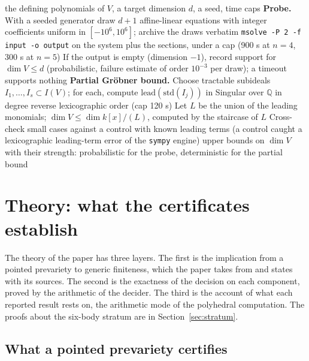 \documentclass[11pt]{article}
\theoremstyle{definition}
\theoremstyle{remark}
\begin{document}
\begin{algorithm}[t]
\caption{Dimension bounds for a variety $V$: random section probe and partial Gr\"obner bound.}\label{alg:probe}
\begin{algorithmic}[1]
\Require the defining polynomials of $V$, a target dimension $d$, a seed, time caps
\State \textbf{Probe.} With a seeded generator draw $d+1$ affine-linear equations with integer coefficients uniform in $[-10^6,10^6]$; archive the draws verbatim
\State \texttt{msolve -P 2 -f input -o output} on the system plus the sections, under a cap (900 s at $n=4$, 300 s at $n=5$)
\State If the output is empty (dimension $-1$), record support for $\dim V\le d$ (probabilistic, failure estimate of order $10^{-3}$ per draw); a timeout supports nothing
\State \textbf{Partial Gr\"obner bound.} Choose tractable subideals $I_1,\dots,I_s\subset I(V)$; for each, compute $\mathrm{lead}(\mathrm{std}(I_j))$ in Singular over $\mathbb{Q}$ in degree reverse lexicographic order (cap 120 s)
\State Let $L$ be the union of the leading monomials; $\dim V\le\dim k[x]/(L)$, computed by the staircase of $L$
\State Cross-check small cases against a control with known leading terms (a control caught a lexicographic leading-term error of the \texttt{sympy} engine)
\Ensure upper bounds on $\dim V$ with their strength: probabilistic for the probe, deterministic for the partial bound
\end{algorithmic}
\end{algorithm}

\section{Theory: what the certificates establish}\label{sec:theory}

The theory of the paper has three layers. The first is the implication from a pointed prevariety to generic finiteness, which the paper
takes from \cite{JL25} and states with its sources. The second is the exactness of the decision on each component, proved by the arithmetic
of the decider. The third is the account of what each reported result rests on, the arithmetic mode of the polyhedral computation. The proofs
about the six-body stratum are in Section~\ref{sec:stratum}.

\subsection{What a pointed prevariety certifies}\label{sec:certifies}
\end{document}
